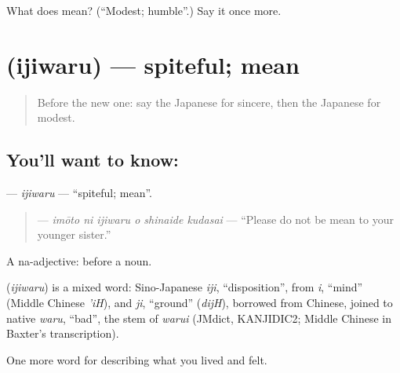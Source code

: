 \begin{tcolorbox}[breakable,colback=teal!4,colframe=teal!35!black,title={Before you move on}]
What does  mean? (\textquotedblleft{}Modest; humble\textquotedblright{}.) Say it once more.
\end{tcolorbox}
\section[\texorpdfstring{\ja{いじわる} (ijiwaru)}{いじわる (ijiwaru)}]{ (ijiwaru) — spiteful; mean}

\label{lesson:JA-C437-ijiwaru}



\begin{quote}
Before the new one: say the Japanese for sincere, then the Japanese for modest.
\end{quote}

\subsection*{You'll want to know: }
\textbf{} — \emph{ijiwaru} — \textquotedblleft{}spiteful; mean\textquotedblright{}.

\begin{quote}
\textbf{   } — \emph{imōto ni ijiwaru o shinaide kudasai} — \textquotedblleft{}Please do not be mean to your younger sister.\textquotedblright{}
\end{quote}

A na-adjective:  before a noun.

\begin{cousinweb}
\textbf{} (\emph{ijiwaru}) is a mixed word: Sino-Japanese \emph{iji}, \textquotedblleft{}disposition\textquotedblright{}, from \emph{i}, \textquotedblleft{}mind\textquotedblright{} (Middle Chinese \emph{'iH}), and \emph{ji}, \textquotedblleft{}ground\textquotedblright{} (\emph{dijH}), borrowed from Chinese, joined to native \emph{waru}, \textquotedblleft{}bad\textquotedblright{}, the stem of \emph{warui} (JMdict, KANJIDIC2; Middle Chinese in Baxter's transcription).
\end{cousinweb}

\begin{grammarlens}[title={What you've built}]
One more word for describing what you lived and felt.
\end{grammarlens}

